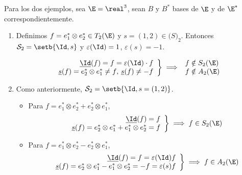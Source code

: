 \begin{example}
    Para los dos ejemplos, sea $ \E = \real^3 $, sean $ B $ y $ B^\ast $
    bases de $ \E $ y de $ \E^\ast $ correspondientemente.
    \begin{enumerate}
        \item
            Definimos $ f = e_1^\ast \otimes e_2^\ast \in T_2(\E) $ y $
            s = (1,2) \in \mathcal(S)_2 $.  Entonces $ \mathcal{S}_2 =
            \setb{\Id, s} $ y $ \varepsilon(\Id) = 1 $, $ \varepsilon(s)
            = -1 $.

            \[
                \left.
                \begin{array}{r}
                    \underline{\Id}(f) = f = \varepsilon (\Id) \cdot f\\
                    \underline{s}(f) = e_2^\ast \otimes e_1^\ast \neq f\text
                    {, } \underline{s}(f)\neq -f
                \end{array}
                \right \} \implies
                \begin{array}{l}
                    f \notin S _2(\E)\\
                    f \notin A_2(\E)
                \end{array}
            \]
        \item
            Como anteriormente, $ \mathcal{S}_2 = \setb{\Id, s = (1,2)} $.
            \begin{itemize}
                \item
                    Para $ f = e_1^\ast \otimes e_2^\ast + e_2^\ast
                    \otimes e_1^\ast $,
                    \[
                        \left.
                        \begin{array}{r}
                            \underline{\Id}(f) = f\\
                            \underline{s}(f) = e_2^\ast \otimes e_1^\ast
                            + e_1^\ast \otimes e_2^\ast = f
                        \end{array}
                        \right \} \implies f \in S_2(\E)
                    \]
                \item
                    Para $ f = e_1^\ast \otimes e_2^\ast - e_2^\ast
                    \otimes e_1^\ast $,
                    \[
                        \left.
                        \begin{array}{r}
                            \underline{\Id}(f) = f = \varepsilon(\Id)f\\
                            \underline{s}(f) = e_2^\ast \otimes e_1^\ast
                            - e_1^\ast \otimes e_2^\ast = -f =
                            \varepsilon(s)f
                        \end{array}
                        \right \} \implies f \in A_2(\E)
                    \]
            \end{itemize}

    \end{enumerate}
\end{example}
